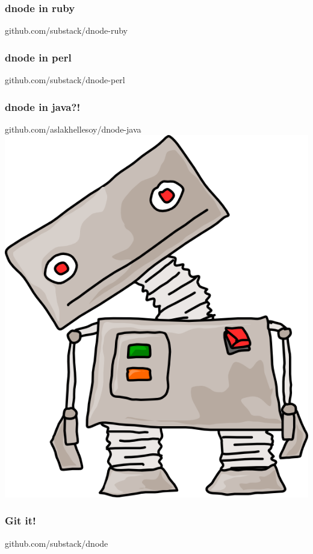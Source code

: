 \documentclass{beamer}
\begin{document}
\begin{frame}
    \frametitle{dnode in ruby}
    \begin{center}
        \huge
        github.com/substack/dnode-ruby
        \newline
        \normalsize
        \fbox{}
    \end{center}
\end{frame}

\begin{frame}
    \frametitle{dnode in perl}
    \begin{center}
        \huge
        github.com/substack/dnode-perl
        \newline
        \normalsize
        \fbox{}
    \end{center}
\end{frame}

\begin{frame}
    \frametitle{dnode in java?!}
    \begin{center}
        \huge
        github.com/aslakhellesoy/dnode-java
        \newline
        \includegraphics[scale=0.6]{images/robot_stare.png}
    \end{center}
\end{frame}

\begin{frame}
    \frametitle{Git it!}
    \begin{center}
        \huge
        github.com/substack/dnode
    \end{center}
\end{frame}
\end{document}
